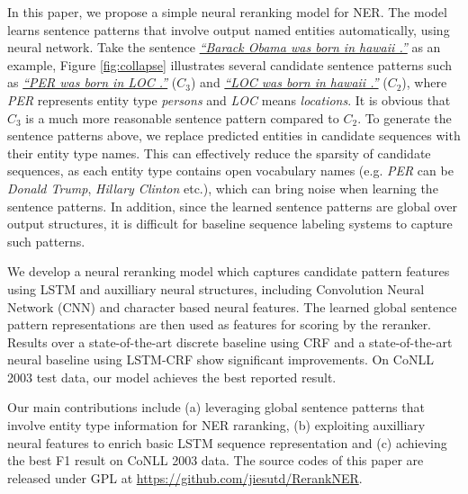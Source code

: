 \documentclass[11pt,a4paper]{article}
\begin{document}
In this paper, we propose a simple neural reranking model for NER. The model learns sentence patterns that involve output named entities automatically, using neural network. Take the sentence \textit{\ul{``Barack Obama was born in hawaii .''}} as an example, Figure \ref{fig:collapse} illustrates several candidate sentence patterns such as \textit{\ul{``PER was born in LOC .''}} ($C_3$) and \textit{\ul{``LOC was born in hawaii .''}} ($C_2$), where \textit{PER} represents entity type \textit{persons} and \textit{LOC} means \textit{locations}. It is obvious that $C_3$ is a much more reasonable sentence pattern compared to $C_2$. To generate the sentence patterns above, we replace predicted entities in candidate sequences with their entity type names. This can effectively reduce the sparsity of candidate sequences, as each entity type contains open vocabulary names (e.g. \textit{PER} can be \textit{Donald Trump}, \textit{Hillary Clinton} etc.), which can bring noise when learning the sentence patterns. In addition, since the learned sentence patterns are global over output structures, it is difficult for baseline sequence labeling systems to capture such patterns.

We develop a neural reranking model which captures candidate pattern features using LSTM and auxilliary neural structures, including Convolution Neural Network (CNN) \cite{kim2014convolutional,kalchbrenner2014convolutional} and character based neural features. The learned global sentence pattern representations are then used as features for scoring by the reranker. Results over a state-of-the-art discrete baseline using CRF and a state-of-the-art neural baseline using LSTM-CRF show significant improvements. On CoNLL 2003 test data, our model achieves the best reported result.

Our main contributions include (a) leveraging global sentence patterns that involve entity type information for NER raranking, (b) exploiting auxilliary neural features to enrich basic LSTM sequence representation and (c) achieving the best F1 result on CoNLL 2003 data. The source codes of this paper are released under GPL at \url{https://github.com/jiesutd/RerankNER}.
\end{document}
